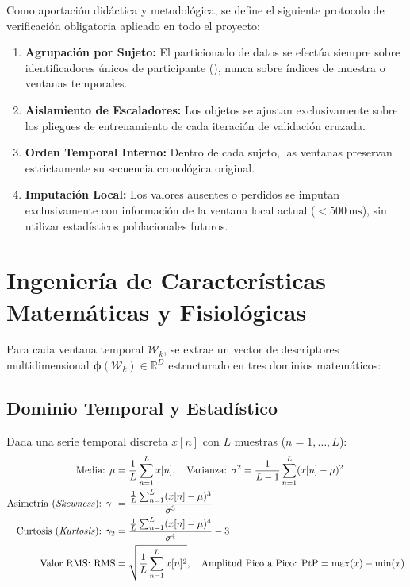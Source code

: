 Como aportación didáctica y metodológica, se define el siguiente protocolo de verificación obligatoria aplicado en todo el proyecto:
\begin{enumerate}
    \item[$\checkmark$] \textbf{Agrupación por Sujeto:} El particionado de datos se efectúa siempre sobre identificadores únicos de participante (), nunca sobre índices de muestra o ventanas temporales.
    \item[$\checkmark$] \textbf{Aislamiento de Escaladores:} Los objetos  se ajustan exclusivamente sobre los pliegues de entrenamiento de cada iteración de validación cruzada.
    \item[$\checkmark$] \textbf{Orden Temporal Interno:} Dentro de cada sujeto, las ventanas preservan estrictamente su secuencia cronológica original.
    \item[$\checkmark$] \textbf{Imputación Local:} Los valores ausentes o perdidos se imputan exclusivamente con información de la ventana local actual ($<500\,\text{ms}$), sin utilizar estadísticos poblacionales futuros.
\end{enumerate}



\section{Ingeniería de Características Matemáticas y Fisiológicas}
\label{sec:feature_engineering}

Para cada ventana temporal $\mathcal{W}_k$, se extrae un vector de descriptores multidimensional $\bm{\phi}(\mathcal{W}_k) \in \mathbb{R}^D$ estructurado en tres dominios matemáticos:

\subsection{Dominio Temporal y Estadístico}
Dada una serie temporal discreta $x[n]$ con $L$ muestras ($n = 1, \dots, L$):
\begin{align}
    \text{Media: } \mu &= \frac{1}{L}\sum_{n=1}^L x[n], \quad \text{Varianza: } \sigma^2 = \frac{1}{L-1}\sum_{n=1}^L (x[n] - \mu)^2 \\
    \text{Asimetría (\textit{Skewness}): } \gamma_1 &= \frac{\frac{1}{L}\sum_{n=1}^L (x[n] - \mu)^3}{\sigma^3} \\
    \text{Curtosis (\textit{Kurtosis}): } \gamma_2 &= \frac{\frac{1}{L}\sum_{n=1}^L (x[n] - \mu)^4}{\sigma^4} - 3 \\
    \text{Valor RMS: } \text{RMS} &= \sqrt{\frac{1}{L}\sum_{n=1}^L x[n]^2}, \quad \text{Amplitud Pico a Pico: } \text{PtP} = \max(x) - \min(x)
\end{align}

